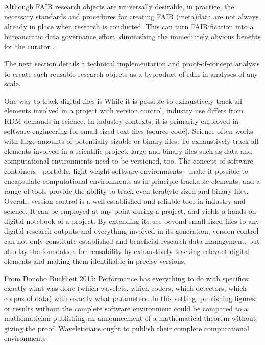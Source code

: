 
Although FAIR research objects are universally desirable, in practice, the necessary standards and procedures for creating FAIR (meta)data are not always already in place when research is conducted.
This can turn FAIRification into a bureaucratic data governance effort, diminishing the immediately obvious benefits for the curator \citep{zehl2016handling}.


The next section details a technical implementation and proof-of-concept analysis to create such reusable research objects as a byproduct of \gls{rdm} in analyses of any scale.





One way to track digital files is
While it is possible to exhaustively track all elements involved in a project with version control, industry use differs from RDM demands in science.
In industry contexts, it is primarily employed in software engineering for small-sized text files (source code). Science often works with large amounts of potentially sizable or binary files.
To exhaustively track all elements involved in a scientific project, large and binary files such as data and computational environments need to be versioned, too.
The concept of software containers - portable, light-weight software environments - make it possible to encapsulate computational environments as in-principle trackable elements, and a range of tools provide the ability to track even terabyte-sized and binary files.
Overall, version control is a well-established and reliable tool in industry and science. It can be employed at any point during a project, and yields a hands-on digital notebook of a project.
By extending its use beyond small-sized files to any digital research outputs and everything involved in its generation, version control can not only constitute established and beneficial research data management, but also lay the foundation for reusability by exhaustively tracking relevant digital elements and making them identifiable in precise versions.

From Donoho Buckheit 2015: Performance has everything to do with specifics: exactly what was done (which wavelets,
which coders, which detectors, which corpus of data) with exactly what parameters. In
this setting, publishing figures or results without the complete software environment could
be compared to a mathematician publishing an announcement of a mathematical theorem
without giving the proof. Waveleticians ought to publish their complete computational
environments


